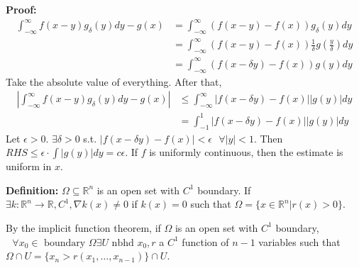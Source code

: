 \documentclass{article}
\newcommand*{\txt}[1]{\text{ #1 }}%
\newcommand*{\fora}{\txt{}\forall}%
\newcommand*{\rr}{\mathbb{R}}%
\begin{document}
\textbf{Proof:} \begin{align*}
    \int_{-\infty}^{\infty}f(x-y)g_\delta(y)dy-g(x)&=\int_{-\infty}^{\infty}(f(x-y)-f(x))g_\delta(y)dy\\
    &=\int_{-\infty}^{\infty}(f(x-y)-f(x))\frac{1}{\delta}g(\frac{y}{\delta})dy\\
    &=\int_{-\infty}^{\infty}(f(x-\delta y)-f(x))g(y)dy
\end{align*}Take the absolute value of everything. After that, \begin{align*}
    |\int_{-\infty}^{\infty}f(x-y)g_\delta(y)dy-g(x)|&\leq \int_{-\infty}^{\infty}|f(x-\delta y)-f(x)||g(y)|dy\\
    &=\int_{-1}^{1}|f(x-\delta y)-f(x)||g(y)|dy
\end{align*}Let $\epsilon>0$. $\exists \delta>0$ s.t. $|f(x-\delta y)-f(x)|<\epsilon\fora |y|<1$. Then $RHS\leq \epsilon\cdot\int |g(y)|dy=c\epsilon$. If $f$ is uniformly continuous, then the estimate is uniform in $x$.

\textbf{Definition:} $\Omega \subseteq \rr^n$ is an open set with $C^1$ boundary. If $\exists k:\rr^n\to \rr, C^1, \nabla k(x)\neq 0$ if $k(x)=0$ such that $\Omega=\{x\in \rr^n|r(x)>0\}$. 

By the implicit function theorem, if $\Omega$ is an open set with $C^1$ boundary, $\fora x_0\in\txt{boundary}\Omega \exists U\txt{nbhd}x_0, r$ a $C^1$ function of $n-1$ variables such that $\Omega\cap U=\{x_n>r(x_1,\dots,x_{n-1})\}\cap U$. 
    
\end{document}
